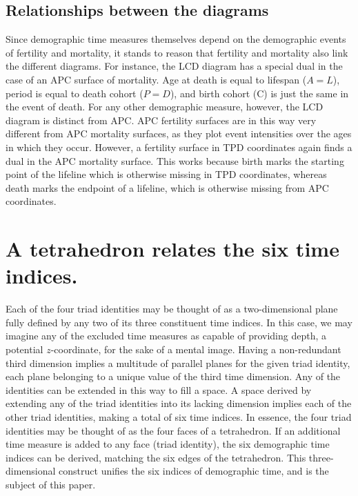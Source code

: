 \documentclass[12pt,oneside,a4paper]{article} %
\begin{document}
\subsection{Relationships between the diagrams}
Since demographic time measures themselves depend on the demographic events of
fertility and mortality, it stands to reason that fertility and mortality also
link the different diagrams. For instance, the LCD diagram has a
special dual in the case of an APC surface of mortality. Age
at death is equal to lifespan ($A=L$), period is equal to death cohort ($P=D$), and birth cohort (C) is just the same in the event of death. For any
other demographic measure, however, the LCD diagram is distinct from APC. 
APC fertility surfaces are in this way very different from APC mortality
surfaces, as they plot event intensities over the ages in which they occur.
However, a fertility surface in TPD coordinates again finds a dual in the APC
mortality surface. This works because birth marks the starting point of the
lifeline which is otherwise missing in TPD coordinates, whereas death marks the
endpoint of a lifeline, which is otherwise missing from APC coordinates. 

\FloatBarrier
\section{A tetrahedron relates the six time indices.}
Each of the four triad identities may be thought of as a
two-dimensional plane fully defined by any two of its three constituent time
indices.
In this case, we may imagine any of the excluded time measures as capable of
providing depth, a potential $z$-coordinate, for the sake of a mental image.
Having a non-redundant third dimension implies a multitude of parallel planes
for the given triad identity, each plane belonging to a unique value of the
third time dimension. Any of the identities can be extended in this way to fill a space. A space derived by
extending any of the triad identities into its lacking dimension implies each of
the other triad identities, making a total of six time indices. In essence, the
four triad identities may be thought of as the four faces of a
tetrahedron. If an additional time measure is added to any face (triad
identity), the six demographic time indices can be derived, matching the six edges of the tetrahedron. This three-dimensional construct unifies the six indices of demographic time, and is the subject of this paper.
\end{document}
